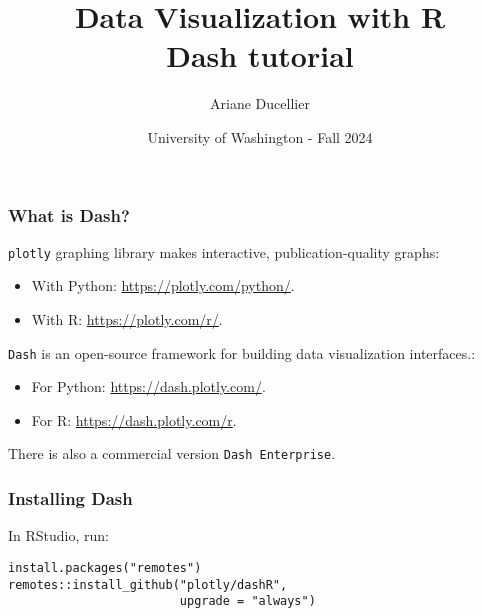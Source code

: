 \documentclass{beamer}
\title[Data Visualization with R - Dash tutorial]{Data Visualization with R \\ Dash tutorial}
\author{Ariane Ducellier}
\date{University of Washington - Fall 2024}
\begin{document}
	\begin{frame}
		\titlepage
	\end{frame}

	\begin{frame}[fragile]
		\frametitle{What is Dash?}

		\verb|plotly| graphing library makes interactive, publication-quality graphs:
		\begin{itemize}
			\item With Python: \href{https://plotly.com/python/}{https://plotly.com/python/}.
			\item With R: \href{https://plotly.com/r/}{https://plotly.com/r/}.
		\end{itemize}

		\vspace{1em}

		\verb|Dash| is an open-source framework for building data visualization interfaces.:
		\begin{itemize}
			\item For Python: \href{https://dash.plotly.com/}{https://dash.plotly.com/}.
			\item For R: \href{https://dash.plotly.com/r}{https://dash.plotly.com/r}.
		\end{itemize}

		\vspace{1em}

		There is also a commercial version \verb|Dash Enterprise|.

	\end{frame}

	\begin{frame}[fragile]
		\frametitle{Installing Dash}

		In RStudio, run:

		\begin{exampleblock}{}
		\begin{BVerbatim}
install.packages("remotes")
remotes::install_github("plotly/dashR",
                        upgrade = "always")
		\end{BVerbatim}
		\end{exampleblock}{}

	\end{frame}
\end{document}
